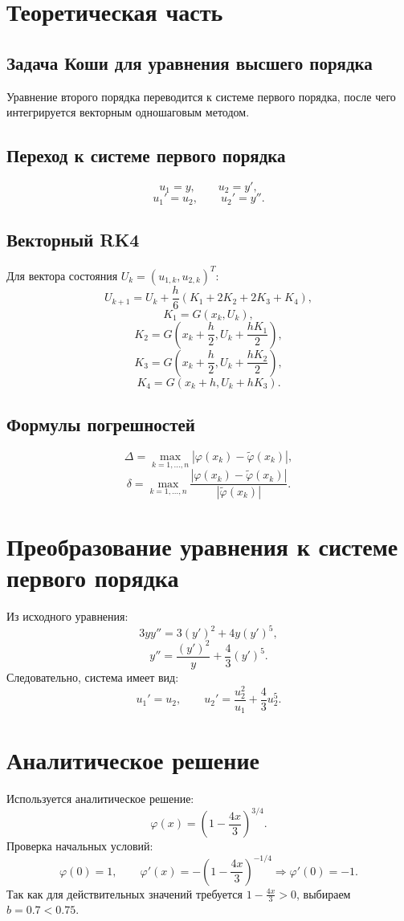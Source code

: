 \documentclass[12pt,a4paper]{article}
\begin{document}
\section{Теоретическая часть}
\subsection{Задача Коши для уравнения высшего порядка}
Уравнение второго порядка переводится к системе первого порядка, после чего интегрируется векторным одношаговым методом.

\subsection{Переход к системе первого порядка}
\[
u_1=y,\qquad u_2=y',
\]
\[
u_1'=u_2,\qquad u_2'=y''.
\]

\subsection{Векторный RK4}
Для вектора состояния $U_k=(u_{1,k},u_{2,k})^T$:
\[
U_{k+1}=U_k+\frac{h}{6}(K_1+2K_2+2K_3+K_4),
\]
\[
K_1=G(x_k,U_k),
\]
\[
K_2=G\left(x_k+\frac{h}{2},U_k+\frac{hK_1}{2}\right),
\]
\[
K_3=G\left(x_k+\frac{h}{2},U_k+\frac{hK_2}{2}\right),
\]
\[
K_4=G(x_k+h,U_k+hK_3).
\]

\subsection{Формулы погрешностей}
\[
\Delta=\max_{k=1,\ldots,n}\left|\varphi(x_k)-\widetilde{\varphi}(x_k)\right|,
\]
\[
\delta=\max_{k=1,\ldots,n}
\frac{\left|\varphi(x_k)-\widetilde{\varphi}(x_k)\right|}
{\left|\widetilde{\varphi}(x_k)\right|}.
\]

\section{Преобразование уравнения к системе первого порядка}
Из исходного уравнения:
\[
3yy''=3(y')^2+4y(y')^5,
\]
\[
y''=\frac{(y')^2}{y}+\frac{4}{3}(y')^5.
\]
Следовательно, система имеет вид:
\[
u_1'=u_2,\qquad
u_2'=\frac{u_2^2}{u_1}+\frac{4}{3}u_2^5.
\]

\section{Аналитическое решение}
Используется аналитическое решение:
\[
\varphi(x)=\left(1-\frac{4x}{3}\right)^{3/4}.
\]
Проверка начальных условий:
\[
\varphi(0)=1,\qquad
\varphi'(x)=-\left(1-\frac{4x}{3}\right)^{-1/4}\Rightarrow \varphi'(0)=-1.
\]
Так как для действительных значений требуется $1-\frac{4x}{3}>0$, выбираем $b=0.7<0.75$.
\end{document}

